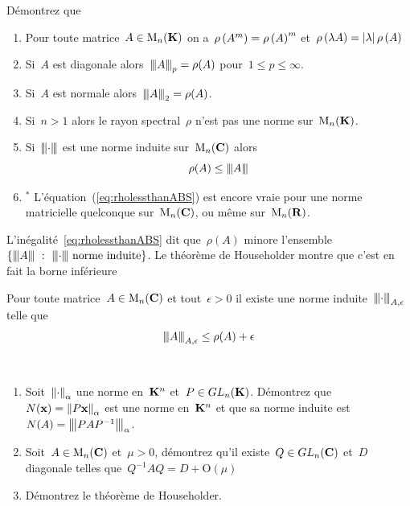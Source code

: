 
\begin{exercice}
	Démontrez que %
	\begin{enumerate}
		\item Pour toute matrice~$A\in\M_n(\K)$ on
			a~$\rho\parens{A^m}=\rho\parens{A}^m$ et~$\rho\parens{\lambda
			A}=\abs\lambda\rho\parens{A}$
		\item Si~$A$ est diagonale alors~$\ABS A_p=\rho(A)$
			pour~$1\le p\le\infty$.
		\item Si~$A$ est normale alors~$\ABS A_2=\rho(A)$.
		\item Si~$n>1$ alors le rayon spectral~$\rho$ n'est pas une norme
			sur~$\M_n(\K)$.
		\item Si~$\ABS\cdot$ est une norme induite sur~$\M_n(\C)$ alors
			\begin{equation}\label{eq:rholessthanABS}
				\rho(A)\le\ABS A
			\end{equation}
		\item${}^*$ L'équation~(\ref{eq:rholessthanABS}) est encore vraie pour
			une norme matricielle quelconque sur~$\M_n(\C)$, ou même
			sur~$\M_n(\R)$.
	\end{enumerate}
\end{exercice}


L'inégalité~\ref{eq:rholessthanABS} dit que~$\rho(A)$ minore
l'ensemble~$\left\{\ABS A\ :\ \ABS\cdot\ \textrm{norme induite}\right\}$.  Le
théorème de Householder montre que c'est en fait la borne inférieure

\begin{theorem}[Householder]
	Pour toute matrice~$A\in\M_n(\C)$ et tout~$\epsilon>0$ il existe une norme
	induite~$\ABS\cdot_{A,\epsilon}$ telle que
	\begin{equation}\label{eq:rholessthanABS}
		\ABS A_{A,\epsilon}\le\rho(A)+\epsilon
	\end{equation}
\end{theorem}

\begin{exercice}$ $
	\begin{enumerate}
		\item Soit~$\Abs\cdot_\alpha$ une norme en~$\K^n$ et~$P\in GL_n(\K)$.
			Démontrez que~$N(\x)=\Abs{P\x}_\alpha$ est une norme en~$\K^n$ et que
			sa norme induite est~$N(A)=\ABS{PAP^{-1}}_\alpha$.
		\item Soit~$A\in\M_n(\C)$ et~$\mu>0$, démontrez qu'il existe~$Q\in
			GL_n(\C)$ et~$D$ diagonale telles que~$Q^{-1}AQ=D+\mathrm{O}(\mu)$
		\item Démontrez le théorème de Householder.
	\end{enumerate}
\end{exercice}



